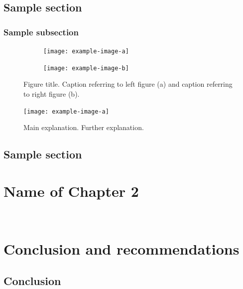 \documentclass[11pt]{report}
\numberwithin{equation}{chapter}		%
\numberwithin{figure}{chapter}			%
\numberwithin{table}{chapter}			%
\begin{document}
\section{Sample section}
\lipsum[3-6]
\subsection{Sample subsection}
\lipsum[3-6]

\begin{figure}[ht]
	\centering
	\begin{subfigure}{0.48\linewidth}
		\centering
		\texttt{[image: example-image-a]}
		\caption{}
		\label{fig:label1}
	\end{subfigure}
	\begin{subfigure}{0.48\linewidth}
		\centering
		\texttt{[image: example-image-b]}
		\caption{}
		\label{fig:label2}
	\end{subfigure}
	\caption{Figure title. Caption referring to left figure (a) and caption referring to right figure (b).}
	\label{fig:label3}
\end{figure}

\begin{figure}[ht]
    \centering
    \texttt{[image: example-image-a]}
    \caption{Main explanation. Further explanation.}
    \label{fig:label4}
\end{figure}

\section{Sample section}
\lipsum[3-6]

\newpage

\chapter{Name of Chapter 2}
\lipsum[3-6]

\newpage
\thispagestyle{empty} \ \newpage

\chapter{Conclusion and recommendations}
\section{Conclusion}
\lipsum[3]
\end{document}
